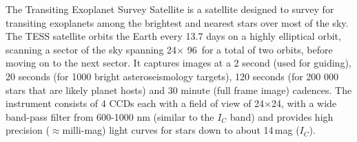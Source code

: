 \documentclass[sn-nature]{sn-jnl}%
\begin{document}




The Transiting Exoplanet Survey Satellite \cite[TESS; ][]{2015JATIS...1a4003R} is a satellite designed to survey for transiting exoplanets among the brightest and nearest stars over most of the sky.
%
The TESS satellite orbits the Earth every 13.7 days on a highly elliptical orbit, scanning a sector of the sky spanning 24\degr $\times$ 96\degr\ for a total of two orbits, before moving on to the next sector. 
%
It captures images at a 2 second (used for guiding), 20 seconds (for 1000 bright asteroseismology targets), 120 seconds (for 200 000 stars that are likely planet hosts) and 30 minute (full frame image) cadences.
%
The instrument consists of 4 CCDs each with a field of view of 24\degr$\times$24\degr, with a wide band-pass filter from 600-1000 nm (similar to the $I_C$ band) and provides high precision ($\approx$milli-mag) light curves for stars down to about 14\,mag ($I_C$).
%



\end{document}
